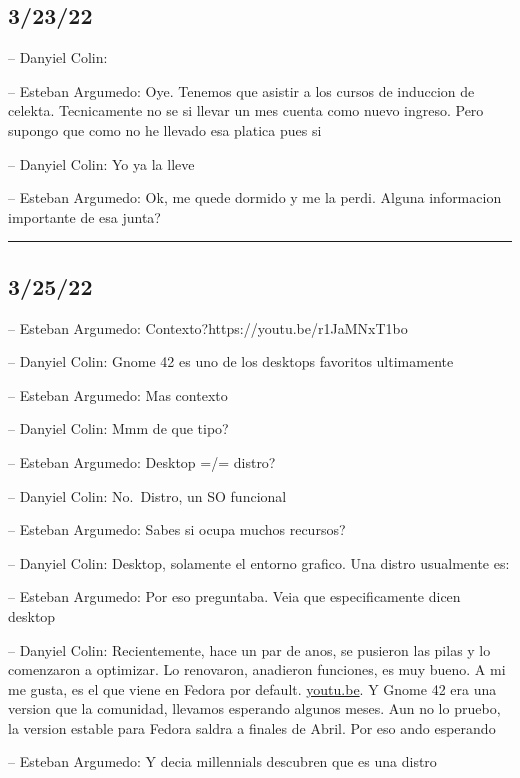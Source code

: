\hypertarget{section-37}{%
\subsection{3/23/22}\label{section-37}}

-- Danyiel Colin:

-- Esteban Argumedo: Oye. Tenemos que asistir a los cursos de induccion
de celekta. Tecnicamente no se si llevar un mes cuenta como nuevo
ingreso. Pero supongo que como no he llevado esa platica pues si

-- Danyiel Colin: Yo ya la lleve

-- Esteban Argumedo: Ok, me quede dormido y me la perdi. Alguna
informacion importante de esa junta?

\begin{center}\rule{0.5\linewidth}{0.5pt}\end{center}

\hypertarget{section-38}{%
\subsection{3/25/22}\label{section-38}}

-- Esteban Argumedo: Contexto?https://youtu.be/r1JaMNxT1bo

-- Danyiel Colin: Gnome 42 es uno de los desktops favoritos ultimamente

-- Esteban Argumedo: Mas contexto

-- Danyiel Colin: Mmm de que tipo?

-- Esteban Argumedo: Desktop =/= distro?

-- Danyiel Colin: No.~Distro, un SO funcional

-- Esteban Argumedo: Sabes si ocupa muchos recursos?

-- Danyiel Colin: Desktop, solamente el entorno grafico. Una distro
usualmente es:

-- Esteban Argumedo: Por eso preguntaba. Veia que especificamente dicen
desktop

-- Danyiel Colin: Recientemente, hace un par de anos, se pusieron las
pilas y lo comenzaron a optimizar. Lo renovaron, anadieron funciones, es
muy bueno. A mi me gusta, es el que viene en Fedora por default.
\href{https://youtu.be/du-2QpWbiLU}{youtu.be}. Y Gnome 42 era una
version que la comunidad, llevamos esperando algunos meses. Aun no lo
pruebo, la version estable para Fedora saldra a finales de Abril. Por
eso ando esperando

-- Esteban Argumedo: Y decia millennials descubren que es una distro

